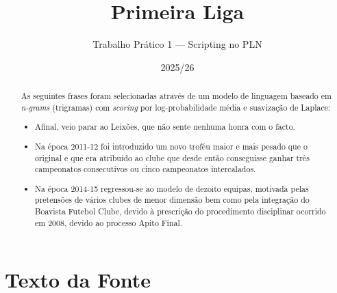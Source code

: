 \documentclass[a4paper,12pt]{article}
\title{Primeira Liga}
\author{Trabalho Prático 1 --- Scripting no PLN}
\date{2025/26}
\begin{document}
\maketitle

\begin{abstract}
As seguintes frases foram selecionadas através de um modelo de linguagem
baseado em \textit{n-grams} (trigramas) com \textit{scoring} por
log-probabilidade média e suavização de Laplace:
\begin{itemize}
  \item Afinal, veio parar ao Leixões, que não sente nenhuma honra com o facto.
  \item Na época 2011-12 foi introduzido um novo troféu maior e mais pesado que o original e que era atribuído ao clube que desde então conseguisse ganhar três campeonatos consecutivos ou cinco campeonatos intercalados.
  \item Na época 2014-15 regressou-se ao modelo de dezoito equipas, motivada pelas pretensões de vários clubes de menor dimensão bem como pela integração do Boavista Futebol Clube, devido à prescrição do procedimento disciplinar ocorrido em 2008, devido ao processo Apito Final.
\end{itemize}
\end{abstract}

\section{Texto da Fonte}
\end{document}
